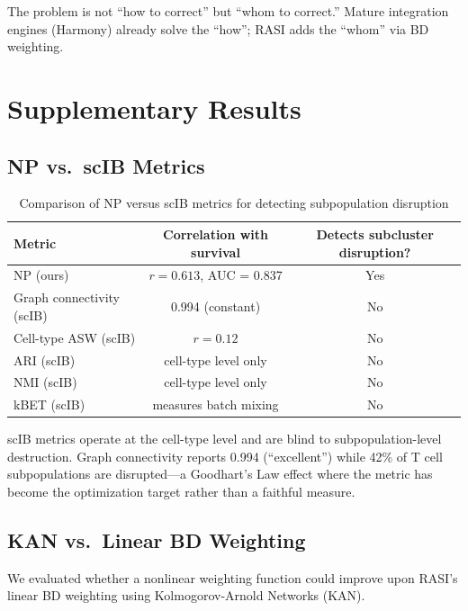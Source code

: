 \documentclass[10pt]{article}
\begin{document}
The problem is not ``how to correct'' but ``whom to correct.'' Mature integration engines (Harmony) already solve the ``how''; RASI adds the ``whom'' via BD weighting.

\section{Supplementary Results}

\subsection{NP vs.\ scIB Metrics}

\begin{table}[h]
\centering
\caption{Comparison of NP versus scIB metrics for detecting subpopulation disruption}
\begin{tabular}{lcc}
\toprule
Metric & Correlation with survival & Detects subcluster disruption? \\
\midrule
NP (ours) & $r = 0.613$, AUC = 0.837 & Yes \\
Graph connectivity (scIB) & 0.994 (constant) & No \\
Cell-type ASW (scIB) & $r = 0.12$ & No \\
ARI (scIB) & cell-type level only & No \\
NMI (scIB) & cell-type level only & No \\
kBET (scIB) & measures batch mixing & No \\
\bottomrule
\end{tabular}
\end{table}

scIB metrics operate at the cell-type level and are blind to subpopulation-level destruction. Graph connectivity reports 0.994 (``excellent'') while 42\% of T cell subpopulations are disrupted---a Goodhart's Law effect where the metric has become the optimization target rather than a faithful measure.

\subsection{KAN vs.\ Linear BD Weighting}

We evaluated whether a nonlinear weighting function could improve upon RASI's linear BD weighting using Kolmogorov-Arnold Networks (KAN).
\end{document}
